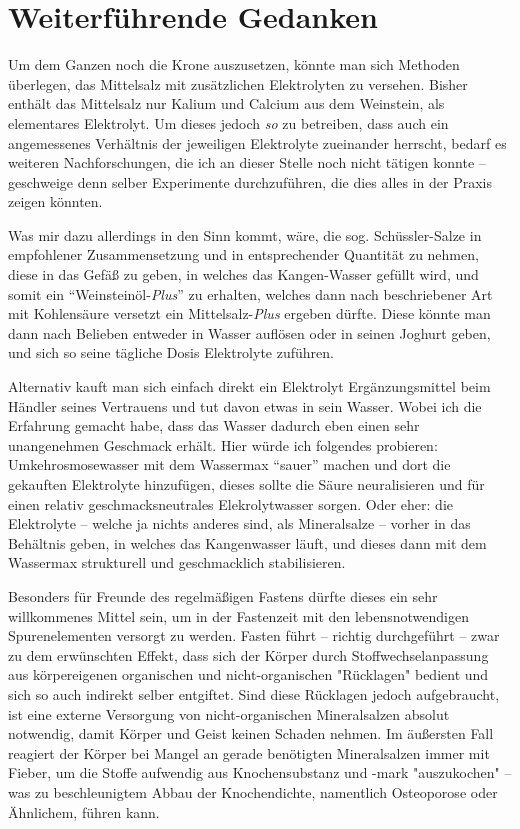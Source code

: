 \documentclass[a5paper,fontsize=10pt]{memoir}
\begin{document}

\section{Weiterführende Gedanken}

Um dem Ganzen noch die Krone auszusetzen, könnte man sich Methoden überlegen, das Mittelsalz mit zusätzlichen Elektrolyten zu versehen. Bisher enthält das Mittelsalz nur Kalium und Calcium aus dem Weinstein, als elementares Elektrolyt. Um dieses jedoch \emph{so} zu betreiben, dass auch ein angemessenes Verhältnis der jeweiligen Elektrolyte zueinander herrscht, bedarf es weiteren Nachforschungen, die ich an dieser Stelle noch nicht tätigen konnte -- geschweige denn selber Experimente durchzuführen, die dies alles in der Praxis zeigen könnten.

Was mir dazu allerdings in den Sinn kommt, wäre, die sog. Schüssler-Salze in empfohlener Zusammensetzung und in entsprechender Quantität zu nehmen, diese in das Gefäß zu geben, in welches das Kangen-Wasser gefüllt wird, und somit ein ``Weinsteinöl-\emph{Plus}'' zu erhalten, welches dann nach beschriebener Art mit Kohlensäure versetzt ein Mittelsalz-\emph{Plus} ergeben dürfte. Diese könnte man dann nach Belieben entweder in Wasser auflösen oder in seinen Joghurt geben, und sich so seine tägliche Dosis Elektrolyte zuführen.

Alternativ kauft man sich einfach direkt ein Elektrolyt Ergänzungsmittel beim Händler seines Vertrauens und tut davon etwas in sein Wasser. Wobei ich die Erfahrung gemacht habe, dass das Wasser dadurch eben einen sehr unangenehmen Geschmack erhält. Hier würde ich folgendes probieren: Umkehrosmosewasser mit dem Wassermax ``sauer'' machen und dort die gekauften Elektrolyte hinzufügen, dieses sollte die Säure neuralisieren und für einen relativ geschmacksneutrales Elekrolytwasser sorgen. Oder eher: die Elektrolyte -- welche ja nichts anderes sind, als Mineralsalze -- vorher in das Behältnis geben, in welches das Kangenwasser läuft, und dieses dann mit dem Wassermax strukturell und geschmacklich stabilisieren.

Besonders für Freunde des regelmäßigen Fastens dürfte dieses ein sehr willkommenes Mittel sein, um in der Fastenzeit mit den lebensnotwendigen Spurenelementen versorgt zu werden. Fasten führt -- richtig durchgeführt -- zwar zu dem erwünschten Effekt, dass sich der Körper durch Stoffwechselanpassung aus körpereigenen organischen und nicht-organischen "Rücklagen" bedient und sich so auch indirekt selber entgiftet. Sind diese Rücklagen jedoch aufgebraucht, ist eine externe Versorgung von nicht-organischen Mineralsalzen absolut notwendig, damit Körper und Geist keinen Schaden nehmen. Im äußersten Fall reagiert der Körper bei Mangel an gerade benötigten Mineralsalzen immer mit Fieber, um die Stoffe aufwendig aus Knochensubstanz und -mark "auszukochen" -- was zu beschleunigtem Abbau der Knochendichte, namentlich Osteoporose oder Ähnlichem, führen kann.
\end{document}
